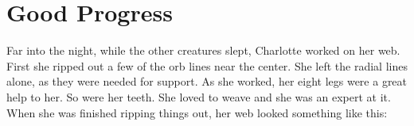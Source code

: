 \documentclass[a4paper, oneside]{book}
\begin{document}
 \chapter{Good Progress}
Far into the night, while the other creatures slept, Charlotte
worked on her web. First she ripped out a few of the orb lines near
the center. She left the radial lines alone, as they were needed for
support. As she worked, her eight legs were a great help to her. So
were her teeth. She loved to weave and she was an expert at it.
When she was finished ripping things out, her web looked
something like this:



 
\end{document}
